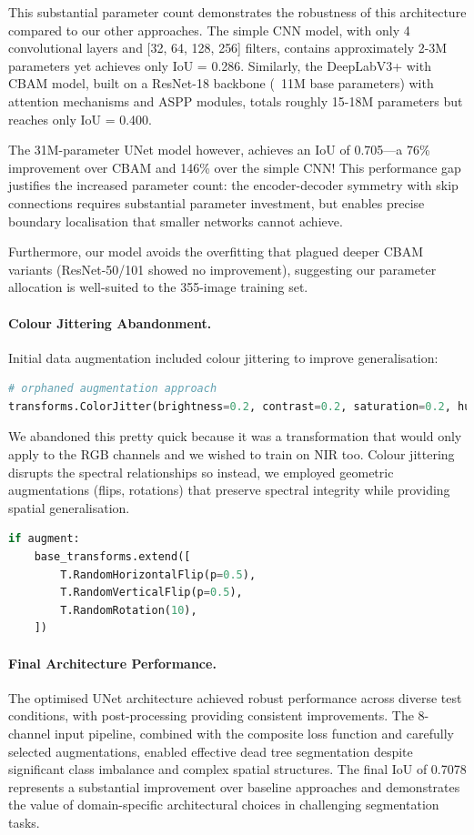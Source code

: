 This substantial parameter count demonstrates the robustness of this architecture compared to our other approaches. The simple CNN model, with only 4 convolutional layers and [32, 64, 128, 256] filters, contains approximately 2-3M parameters yet achieves only IoU = 0.286. Similarly, the DeepLabV3+ with CBAM model, built on a ResNet-18 backbone (~11M base parameters) with attention mechanisms and ASPP modules, totals roughly 15-18M parameters but reaches only IoU = 0.400.

The 31M-parameter UNet model however, achieves an IoU of 0.705—a 76\% improvement over CBAM and 146\% over the simple CNN! This performance gap justifies the increased parameter count: the encoder-decoder symmetry with skip connections requires substantial parameter investment, but enables precise boundary localisation that smaller networks cannot achieve. 

Furthermore, our model avoids the overfitting that plagued deeper CBAM variants (ResNet-50/101 showed no improvement), suggesting our parameter allocation is well-suited to the 355-image training set. 

\paragraph{Colour Jittering Abandonment.}
Initial data augmentation included colour jittering to improve generalisation:

\begin{lstlisting}[language=Python]
# orphaned augmentation approach
transforms.ColorJitter(brightness=0.2, contrast=0.2, saturation=0.2, hue=0.1)
\end{lstlisting}

We abandoned this pretty quick because it was a transformation that would only apply to the RGB channels and we wished to train on NIR too.
Colour jittering disrupts the spectral relationships so instead, we employed geometric augmentations (flips, rotations) that preserve spectral integrity while providing spatial generalisation.

\begin{lstlisting}[language=Python]
if augment:
    base_transforms.extend([
        T.RandomHorizontalFlip(p=0.5),
        T.RandomVerticalFlip(p=0.5),
        T.RandomRotation(10),
    ])
\end{lstlisting}


\paragraph{Final Architecture Performance.}
The optimised UNet architecture achieved robust performance across diverse test conditions, with post-processing providing consistent improvements. The 8-channel input pipeline, combined with the composite loss function and carefully selected augmentations, enabled effective dead tree segmentation despite significant class imbalance and complex spatial structures. The final IoU of 0.7078 represents a substantial improvement over baseline approaches and demonstrates the value of domain-specific architectural choices in challenging segmentation tasks.
